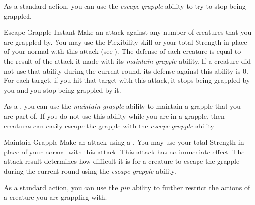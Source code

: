              As a standard action, you can use the \textit{escape grapple} ability to try to stop being grappled.

            \begin{instantability}{Escape Grapple}
                \label{Escape Grapple}
                Instant
                \rankline
                Make an attack against any number of creatures that you are grappled by.
                You may use the Flexibility skill or your total Strength in place of your normal  with this attack (see ).
                The defense of each creature is equal to the result of the attack it made with its \textit{maintain grapple} ability.
                If a creature did not use that ability during the current round, its defense against this ability is 0.
                For each target, if you hit that target with this attack, it stops being grappled by you and you stop being grappled by it.
            \end{instantability}

             As a , you can use the \textit{maintain grapple} ability to maintain a grapple that you are part of.
            If you do not use this ability while you are in a grapple, then creatures can easily escape the grapple with the \textit{escape grapple} ability.
            \begin{instantability}{Maintain Grapple}
                \rankline
                Make an attack using a .
                You may use your total Strength in place of your normal  with this attack.
                This attack has no immediate effect.
                The attack result determines how difficult it is for a creature to escape the grapple during the current round using the \textit{escape grapple} ability.
            \end{instantability}

            \label{Pin} As a standard action, you can use the \textit{pin} ability to further restrict the actions of a creature you are grappling with.

